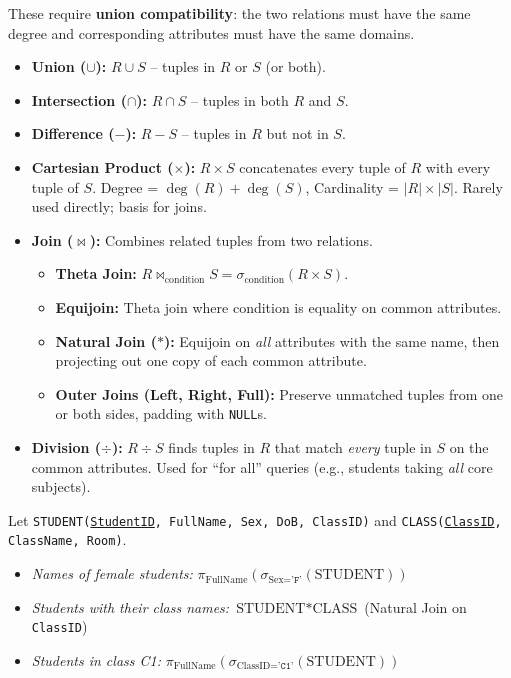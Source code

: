 \documentclass[11pt]{article}
\begin{document}
\begin{definition}
These require \textbf{union compatibility}: the two relations must have the same degree and corresponding attributes must have the same domains.
\begin{itemize}
\item \textbf{Union ($\cup$):} $R \cup S$ -- tuples in $R$ or $S$ (or both).
\item \textbf{Intersection ($\cap$):} $R \cap S$ -- tuples in both $R$ and $S$.
\item \textbf{Difference ($-$):} $R - S$ -- tuples in $R$ but not in $S$.
\end{itemize}
\end{definition}

\begin{definition}
\begin{itemize}
\item \textbf{Cartesian Product ($\times$):} $R \times S$ concatenates every tuple of $R$ with every tuple of $S$. Degree = $\deg(R)+\deg(S)$, Cardinality = $|R|\times|S|$. Rarely used directly; basis for joins.
\item \textbf{Join ($\bowtie$):} Combines related tuples from two relations.
  \begin{itemize}
  \item \textbf{Theta Join:} $R \bowtie_{\text{condition}} S = \sigma_{\text{condition}}(R \times S)$.
  \item \textbf{Equijoin:} Theta join where condition is equality on common attributes.
  \item \textbf{Natural Join ($*$):} Equijoin on \emph{all} attributes with the same name, then projecting out one copy of each common attribute.
  \item \textbf{Outer Joins (Left, Right, Full):} Preserve unmatched tuples from one or both sides, padding with \texttt{NULL}s.
  \end{itemize}
\item \textbf{Division ($\div$):} $R \div S$ finds tuples in $R$ that match \emph{every} tuple in $S$ on the common attributes. Used for ``for all'' queries (e.g., students taking \emph{all} core subjects).
\end{itemize}
\end{definition}

\begin{exemplebox}
Let \texttt{STUDENT(\underline{StudentID}, FullName, Sex, DoB, ClassID)} and \texttt{CLASS(\underline{ClassID}, ClassName, Room)}.
\begin{itemize}
\item \textit{Names of female students:} $\pi_{\text{FullName}}(\sigma_{\text{Sex}=\texttt{'F'}}(\text{STUDENT}))$
\item \textit{Students with their class names:} $\text{STUDENT} * \text{CLASS}$ (Natural Join on \texttt{ClassID})
\item \textit{Students in class C1:} $\pi_{\text{FullName}}(\sigma_{\text{ClassID}=\texttt{'C1'}}(\text{STUDENT}))$
\end{itemize}
\end{exemplebox}
\end{document}
